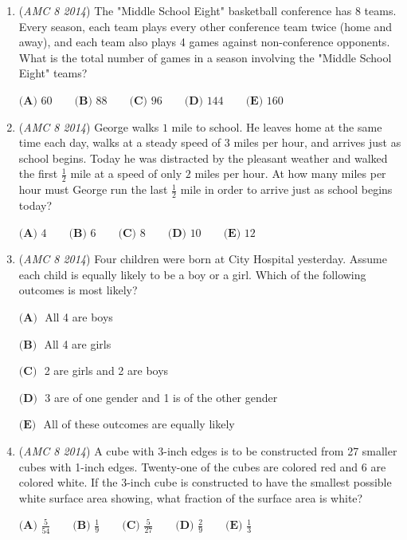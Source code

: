 \begin{enumerate}
$\textbf{(A) }75\qquad\textbf{(B) }80\qquad\textbf{(C) }90\qquad\textbf{(D) }120\qquad\textbf{(E) }150$


	\item (\textit{AMC 8 2014}) The "Middle School Eight" basketball conference has 8 teams. Every season, each team plays every other conference team twice (home and away), and each team also plays 4 games against non-conference opponents. What is the total number of games in a season involving the "Middle School Eight" teams?


 $\textbf{(A) }60\qquad\textbf{(B) }88\qquad\textbf{(C) }96\qquad\textbf{(D) }144\qquad\textbf{(E) }160$


	\item (\textit{AMC 8 2014}) George walks $1$ mile to school. He leaves home at the same time each day, walks at a steady speed of $3$ miles per hour, and arrives just as school begins. Today he was distracted by the pleasant weather and walked the first $\frac{1}{2}$ mile at a speed of only $2$ miles per hour. At how many miles per hour must George run the last $\frac{1}{2}$ mile in order to arrive just as school begins today?


 $\textbf{(A) }4\qquad\textbf{(B) }6\qquad\textbf{(C) }8\qquad\textbf{(D) }10\qquad\textbf{(E) }12$


	\item (\textit{AMC 8 2014}) Four children were born at City Hospital yesterday. Assume each child is equally likely to be a boy or a girl. Which of the following outcomes is most likely?


 $\textbf{(A) }$ All 4 are boys  


 $\textbf{(B) }$ All 4 are girls    


 $\textbf{(C) }$ 2 are girls and 2 are boys


 $\textbf{(D) }$ 3 are of one gender and 1 is of the other gender     


 $\textbf{(E) }$ All of these outcomes are equally likely


 

	\item (\textit{AMC 8 2014}) A cube with 3-inch edges is to be constructed from 27 smaller cubes with 1-inch edges. Twenty-one of the cubes are colored red and 6 are colored white. If the 3-inch cube is constructed to have the smallest possible white surface area showing, what fraction of the surface area is white?


 $\textbf{(A) }\frac{5}{54}\qquad\textbf{(B) }\frac{1}{9}\qquad\textbf{(C) }\frac{5}{27}\qquad\textbf{(D) }\frac{2}{9}\qquad\textbf{(E) }\frac{1}{3}$



\end{enumerate}
